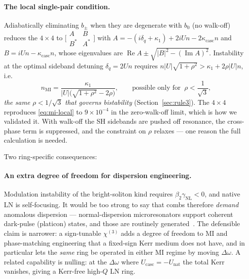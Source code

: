 \documentclass[11pt,a4paper]{article}
\newcommand{\chithree}{\chi^{(3)}}
\newcommand{\Dom}{\Delta\omega}
\newcommand{\Ucasc}{U_{\text{casc}}}
\newcommand{\Unat}{U_{\text{nat}}}
\newcommand{\kcasc}{\kappa_{\text{casc}}}
\begin{document}
\paragraph{The local single-pair condition.}  Adiabatically eliminating
$b_\pm$ when they are degenerate with $b_0$ (no walk-off) reduces the
$4\times4$ to $\bigl[\begin{smallmatrix}A&B\\ B^*&A^*\end{smallmatrix}\bigr]$
with $A=-(i\delta_q+\kappa_1)+2iUn-2\kcasc n$ and $B=iUn-\kcasc n$,
whose eigenvalues are $\operatorname{Re}A\pm\sqrt{|B|^2-(\operatorname{Im}A)^2}$.
Instability at the optimal sideband detuning $\delta_q=2Un$ requires
$n|U|\sqrt{1+\rho^2}>\kappa_1+2\rho|U|n$, i.e.
\begin{equation}
  n_{\text{MI}}=\frac{\kappa_1}{|U|\bigl(\sqrt{1+\rho^2}-2\rho\bigr)},
  \qquad\text{possible only for }\ \rho<\frac{1}{\sqrt3},
  \label{eq:mi-local}
\end{equation}
\emph{the same $\rho<1/\sqrt3$ that governs bistability}
(Section~\ref{sec:rule3}).  The $4\times4$ reproduces
\eqref{eq:mi-local} to $9\times10^{-4}$ in the zero-walk-off limit,
which is how we validated it.  With walk-off the SH sidebands are pushed
off resonance, the cross-phase term is suppressed, and the constraint on
$\rho$ relaxes --- one reason the full calculation is needed.

Two ring-specific consequences:

\paragraph{An extra degree of freedom for dispersion engineering.}
Modulation instability of the bright-soliton kind requires
$\beta_2\gamma_{\text{NL}}<0$, and native LN is self-focusing.  It would
be too strong to say that combs therefore \emph{demand} anomalous
dispersion --- normal-dispersion microresonators support coherent dark-pulse
(platicon) states, and those are routinely generated~\cite{Kippenberg2018}.
The defensible claim is narrower: a sign-tunable $\chithree$ adds a
degree of freedom to MI and phase-matching engineering that a fixed-sign
Kerr medium does not have, and in particular lets the \emph{same} ring
be operated in either MI regime by moving $\Dom$.  A related capability
is nulling: at the $\Dom$ where $\Ucasc=-\Unat$ the total Kerr vanishes,
giving a Kerr-free high-$Q$ LN ring.
\end{document}
